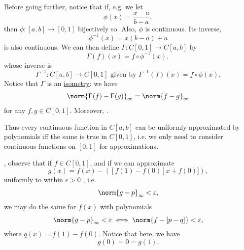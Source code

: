 \documentclass[notoc,notitlepage]{tufte-book}
\begin{document}
Before going further, notice that if, e.g. we let
\begin{equation*}
  \phi(x) = \frac{x - a}{b - a},
\end{equation*}
then $\phi : [a, b] \to [0, 1]$ bijectively so. Also, $\phi$ is continuous. Its inverse,
\begin{equation*}
  \phi^{-1}(x) = x(b - a) + a
\end{equation*}
is also continuous. We can then define $\Gamma: C[0, 1] \to C[a, b]$ by
\begin{equation*}
  \Gamma(f)(x) = f \circ \phi^{-1}(x),
\end{equation*}
whose inverse is
\begin{equation*}
  \Gamma^{-1} : C[a, b] \to C[0, 1] \text{ given by } \Gamma^{-1}(f)(x) = f \circ \phi(x).
\end{equation*}
Notice that $\Gamma$ is an \hyperref[defn:isometry]{isometry}: we have
\begin{equation*}
  \norm{ \Gamma(f) - \Gamma(g) }_\infty = \norm{ f - g }_\infty
\end{equation*}
for any $f, g \in C[0, 1]$. Moreover, .

Thus every continuous function in $C[a, b]$ can be uniformly approximated by polynomials iff the same is true in $C[0, 1]$, i.e. we only need to consider continuous functions on $[0, 1]$ for approximations.

, observe that if $f \in C[0, 1]$, and if we can approximate
\begin{equation*}
  g(x) = f(x) - ([f(1) - f(0)] x + f(0)]),
\end{equation*}
uniformly to within $\epsilon > 0$ , i.e.
\begin{equation*}
  \norm{ g - p }_\infty < \epsilon,
\end{equation*}
we may do the same for $f(x)$ with polynomials
\begin{equation*}
  \norm{g - p}_\infty < \epsilon \iff \norm{ f - [p - q] } < \epsilon,
\end{equation*}
where $q(x) = f(1) - f(0)$. Notice that here, we have
\begin{equation*}
  g(0) = 0 = g(1).
\end{equation*}
\end{document}
